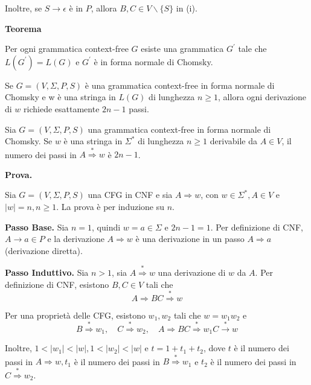 Inoltre, se $S \rightarrow \epsilon$ è in $P$, allora $B, C \in V \backslash\{S\}$ in (i).

\vspace{5mm}

\textbf{Teorema}

Per ogni grammatica context-free $G$ esiste una grammatica $G^{\prime}$ tale che $L\left(G^{\prime}\right)=L(G)$ e $G^{\prime}$ è in forma normale di Chomsky.

\vspace{5mm}

Se $G=(V, \Sigma, P, S)$ è una grammatica context-free in forma normale di Chomsky e w è una stringa in $L(G)$ di lunghezza $n \geq 1$, allora ogni derivazione di $w$ richiede esattamente $2 n-1$ passi.

\vspace{5mm}

Sia $G=(V, \Sigma, P, S)$ una grammatica context-free in forma normale di Chomsky. Se $w$ è una stringa in $\Sigma^{*}$ di lunghezza $n \geq 1$ derivabile da $A \in V$, il numero dei passi in $A \stackrel{*}{\Rightarrow} w$ è $2 n-1$.

\vspace{5mm}

\textbf{Prova. }

Sia $G=(V, \Sigma, P, S)$ una CFG in CNF e sia $A \Rightarrow w$, con $w \in \Sigma^{*}, A \in V$ e $|w|=n, n \geq 1$. La prova è per induzione su $n$.

\vspace{5mm}

\textbf{Passo Base.} Sia $n=1$, quindi $w=a \in \Sigma$ e $2 n-1=1$. Per definizione di CNF, $A \rightarrow a \in P$ e la derivazione $A \Rightarrow w$ è una derivazione in un passo $A \Rightarrow a$ (derivazione diretta).

\vspace{5mm}

\textbf{Passo Induttivo.} Sia $n>1$, sia $A \stackrel{*}{\Rightarrow} w$ una derivazione di $w$ da $A$. Per definizione di CNF, esistono $B, C \in V$ tali che
$$
A \Rightarrow B C \stackrel{*}{\Rightarrow} w
$$

Per una proprietà delle CFG, esistono $w_{1}, w_{2}$ tali che $w=w_{1} w_{2}$ e
$$
B \stackrel{*}{\Rightarrow} w_{1}, \quad C \stackrel{*}{\Rightarrow} w_{2}, \quad A \Rightarrow B C \stackrel{*}{\Rightarrow} w_{1} C \stackrel{*}{\rightarrow} w
$$

Inoltre, $1<\left|w_{1}\right|<|w|, 1<\left|w_{2}\right|<|w|$ e $t=1+t_{1}+t_{2}$, dove $t$ è il numero dei passi in $A \Rightarrow w, t_{1}$ è il numero dei passi in $B \stackrel{*}{\Rightarrow} w_{1}$ e $t_{2}$ è il numero dei passi in $C \stackrel{*}{\Rightarrow} w_{2}$.

